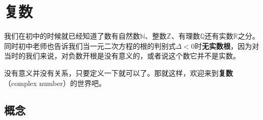 \chapter{复数}
我们在初中的时候就已经知道了数有自然数$\mathbb{N}$、整数$\mathbb{Z}$、有理数$\mathbb{Q}$还有实数$\mathbb{R}$之分。同时初中老师也告诉我们当一元二次方程的根的判别式$\Delta<0$时\textbf{无实数根}，因为对当时的我们来说，对负数开根是没有意义的，或者说这个数它并不是实数。

没有意义并没有关系，只要定义一下就可以了。那就这样，欢迎来到\textbf{复数}（complex number）的世界吧。

\section{概念}
